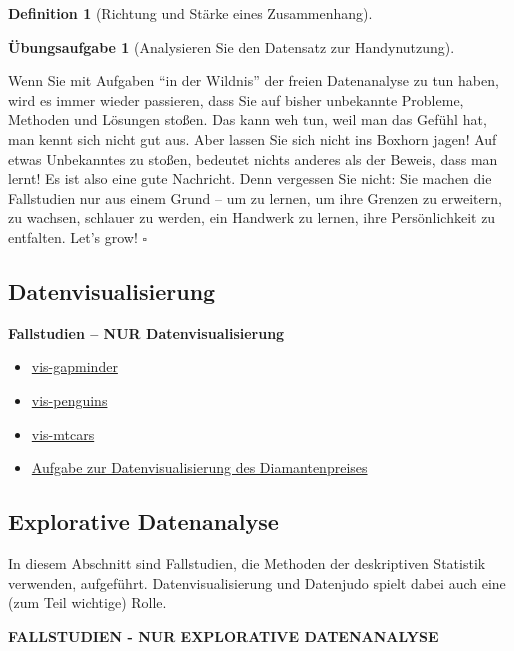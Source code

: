 \documentclass[
  a4paper,
  DIV=11]{scrreprt}
\theoremstyle{definition}
\newtheorem{exercise}{Übungsaufgabe}[chapter]
\theoremstyle{definition}
\theoremstyle{definition}
\newtheorem{definition}{Definition}[chapter]
\theoremstyle{remark}
\begin{document}
\begin{definition}[Richtung und Stärke eines
Zusammenhang]
\begin{exercise}[Analysieren Sie den Datensatz zur
Handynutzung]
\begin{tcolorbox}
Wenn Sie mit Aufgaben ``in der Wildnis'' der freien Datenanalyse zu tun
haben, wird es immer wieder passieren, dass Sie auf bisher unbekannte
Probleme, Methoden und Lösungen stoßen. Das kann weh tun, weil man das
Gefühl hat, man kennt sich nicht gut aus. Aber lassen Sie sich nicht ins
Boxhorn jagen! Auf etwas Unbekanntes zu stoßen, bedeutet nichts anderes
als der Beweis, dass man lernt! Es ist also eine gute Nachricht. Denn
vergessen Sie nicht: Sie machen die Fallstudien nur aus einem Grund --
um zu lernen, um ihre Grenzen zu erweitern, zu wachsen, schlauer zu
werden, ein Handwerk zu lernen, ihre Persönlichkeit zu entfalten. Let's
grow! \(\square\)

\end{tcolorbox}

\subsection{Datenvisualisierung}\label{datenvisualisierung}

\textbf{Fallstudien -- NUR Datenvisualisierung}

\begin{itemize}
\item
  \href{https://datenwerk.netlify.app/posts/vis-gapminder/vis-gapminder}{vis-gapminder}
\item
  \href{https://datenwerk.netlify.app/posts/vis-penguins/vis-penguins}{vis-penguins}
\item
  \href{https://datenwerk.netlify.app/posts/vis-mtcars/vis-mtcars}{vis-mtcars}
\item
  \href{https://data-se.netlify.app/2020/12/07/ex-visualizing-diamonds/}{Aufgabe
  zur Datenvisualisierung des Diamantenpreises}
\end{itemize}

\subsection{Explorative Datenanalyse}\label{explorative-datenanalyse}

In diesem Abschnitt sind Fallstudien, die Methoden der deskriptiven
Statistik verwenden, aufgeführt. Datenvisualisierung und Datenjudo
spielt dabei auch eine (zum Teil wichtige) Rolle.

\textbf{FALLSTUDIEN - NUR EXPLORATIVE DATENANALYSE}


\end{exercise}
\end{definition}
\end{document}
